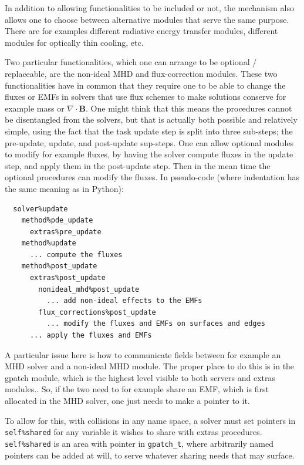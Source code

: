 \documentclass[paper=a4,fontsize=11pt]{scrartcl}
\numberwithin{equation}{section}		%
\numberwithin{figure}{section}			%
\numberwithin{table}{section}				%
\newcommand{\codecolor}{\color{Blue}}
\newcommand{\Code}[1]{{\codecolor\texttt{#1}}}
\begin{document}
In addition to allowing functionalities to be included or not, the mechanism also allows one to choose between alternative modules that serve the same purpose.  There are for examples different radiative energy transfer modules, different modules for optically thin cooling, etc.

Two particular functionalities, which one can arrange to be optional / replaceable, are the non-ideal MHD and flux-correction modules.  These two functionalities have in common that they require one to be able to change the fluxes or EMFs in solvers that use flux schemes
\def\BB{\mathbf{B}}
to make solutions conserve for example mass or $\nabla\cdot\BB$.  One might think that this means the procedures cannot be disentangled from the solvers, but that is actually both possible and relatively simple, using the fact that the task update step is split into three sub-steps; the pre-update, update, and post-update sup-steps.  One can allow optional modules to modify for example fluxes, by having the solver compute fluxes in the update step, and apply them in the post-update step. Then in the mean time the optional procedures can modify the fluxes.  In pseudo-code (where indentation has the same meaning as in Python):

{\codecolor\begin{verbatim}
  solver%update
    method%pde_update
      extras%pre_update
    method%update
      ... compute the fluxes
    method%post_update
      extras%post_update
        nonideal_mhd%post_update
          ... add non-ideal effects to the EMFs
        flux_corrections%post_update
          ... modify the fluxes and EMFs on surfaces and edges
      ... apply the fluxes and EMFs
\end{verbatim}}
A particular issue here is how to communicate fields between for example an MHD solver and a non-ideal MHD module.   The proper place to do this is in the gpatch module, which is the highest level visible to both servers and extras modules..  So, if the two need to for example share an EMF, which is first allocated in the MHD solver, one just needs to make a pointer to it.

To allow for this, with collisions in any name space, a solver must set pointers in \Code{self\%shared} for any variable it wishes to share with extras procedures.  \Code{self\%shared} is an area with pointer in \Code{gpatch\_t}, where arbitrarily named pointers can be added at will, to serve whatever sharing needs that may surface.

\end{document}
